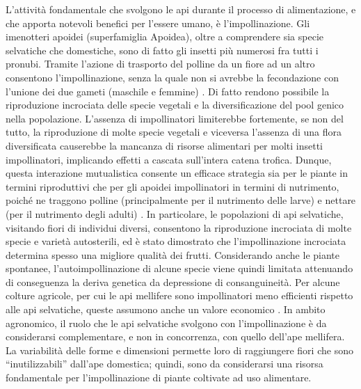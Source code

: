 \documentclass[main.tex]{subfiles}
\begin{document}
L’attività fondamentale che svolgono le api durante il processo di alimentazione, e che apporta notevoli benefici per l’essere umano, è l’impollinazione. Gli imenotteri apoidei (superfamiglia Apoidea), oltre a comprendere sia specie selvatiche che domestiche, sono di fatto gli insetti più numerosi fra tutti i pronubi. Tramite l’azione di trasporto del polline da un fiore ad un altro consentono l’impollinazione, senza la quale non si avrebbe la fecondazione con l’unione dei due gameti (maschile e femmine) \citep{form}. Di fatto rendono possibile la riproduzione incrociata delle specie vegetali e la diversificazione del pool genico nella popolazione.
L’assenza di impollinatori limiterebbe fortemente, se non del tutto, la riproduzione di molte specie vegetali e viceversa l’assenza di una flora diversificata causerebbe la mancanza di risorse alimentari per molti insetti impollinatori, implicando effetti a cascata sull’intera catena trofica. Dunque, questa interazione mutualistica consente un efficace strategia sia per le piante in termini riproduttivi che per gli apoidei impollinatori in termini di nutrimento, poiché ne traggono polline (principalmente per il nutrimento delle larve) e nettare (per il nutrimento degli adulti) \citep{bellu}.
In particolare, le popolazioni di api selvatiche, visitando fiori di individui diversi, consentono la riproduzione incrociata di molte specie e varietà autosterili, ed è stato dimostrato che l’impollinazione incrociata determina spesso una migliore qualità dei frutti. Considerando anche le piante spontanee, l’autoimpollinazione di alcune specie viene quindi limitata attenuando di conseguenza la deriva genetica da depressione di consanguineità. Per alcune colture agricole, per cui le api mellifere sono impollinatori meno efficienti rispetto alle api selvatiche, queste assumono anche un valore economico \citep{capo}.
In ambito agronomico, il ruolo che le api selvatiche svolgono con l’impollinazione è da considerarsi complementare, e non in concorrenza, con quello dell'ape mellifera. La variabilità delle forme e dimensioni permette loro di raggiungere fiori che sono “inutilizzabili” dall'ape domestica; quindi, sono da considerarsi una risorsa fondamentale per l’impollinazione di piante coltivate ad uso alimentare.
\end{document}
